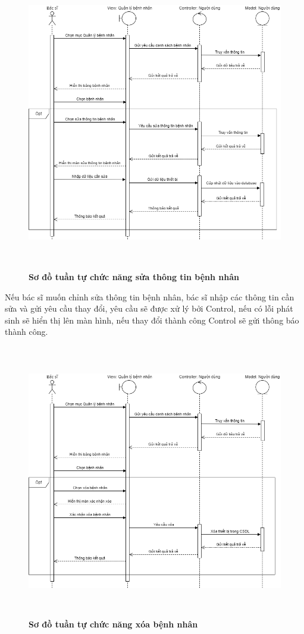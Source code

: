 \begin{figure}[H]
  \centering
  \includegraphics[width=14cm,height=13cm]{Images/sequence/sequence_manage_edit_patient.png}
  \caption[Sơ đồ tuần tự chức năng sửa thông tin bệnh nhân]{\bfseries \fontsize{12pt}{0pt}
  \selectfont Sơ đồ tuần tự chức năng sửa thông tin bệnh nhân}
  \label{sequence_manage_edit_patient} %
\end{figure}
Nếu bác sĩ muốn chỉnh sửa thông tin bệnh nhân, bác sĩ nhập các thông tin cần sửa và gửi yêu cầu thay đổi, yêu cầu sẽ được xử lý bởi Control, 
nếu có lỗi phát sinh sẽ hiển thị lên màn hình, nếu thay đổi thành công Control sẽ gửi thông báo thành công. 
\begin{figure}[H]
  \centering
  \includegraphics[width=14cm,height=12cm]{Images/sequence/sequence_manage_delete_patient.png}
  \caption[Sơ đồ tuần tự chức năng xóa bệnh nhân]{\bfseries \fontsize{12pt}{0pt}
  \selectfont Sơ đồ tuần tự chức năng xóa bệnh nhân}
  \label{sequence_manage_delete_patient} %
\end{figure}
